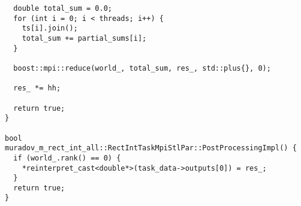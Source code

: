 \documentclass[12pt,a4paper]{extarticle}
\begin{document}
\begin{lstlisting}
  double total_sum = 0.0;
  for (int i = 0; i < threads; i++) {
    ts[i].join();
    total_sum += partial_sums[i];
  }

  boost::mpi::reduce(world_, total_sum, res_, std::plus{}, 0);

  res_ *= hh;

  return true;
}

bool muradov_m_rect_int_all::RectIntTaskMpiStlPar::PostProcessingImpl() {
  if (world_.rank() == 0) {
    *reinterpret_cast<double*>(task_data->outputs[0]) = res_;
  }
  return true;
}
\end{lstlisting}
\end{document}
